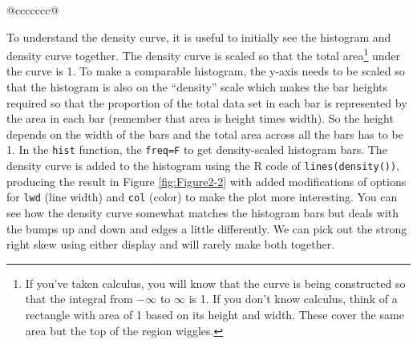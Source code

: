\documentclass[]{book}
\newenvironment{Shaded}{\begin{snugshade}}{\end{snugshade}}
\newcommand{\KeywordTok}[1]{\textcolor[rgb]{0.13,0.29,0.53}{\textbf{#1}}}
\newcommand{\DataTypeTok}[1]{\textcolor[rgb]{0.13,0.29,0.53}{#1}}
\newcommand{\DecValTok}[1]{\textcolor[rgb]{0.00,0.00,0.81}{#1}}
\newcommand{\StringTok}[1]{\textcolor[rgb]{0.31,0.60,0.02}{#1}}
\newcommand{\OperatorTok}[1]{\textcolor[rgb]{0.81,0.36,0.00}{\textbf{#1}}}
\newcommand{\NormalTok}[1]{#1}
\let\rmarkdownfootnote\footnote%
\def\footnote{\protect\rmarkdownfootnote}
\theoremstyle{definition}
\theoremstyle{definition}
\theoremstyle{remark}
\begin{document}
\begin{longtable}[]{@{}ccccccc@{}}
\begin{minipage}[b]{0.10\columnwidth}
To understand the density curve, it is useful to initially see the
histogram and density curve together. The density curve is scaled so
that the total area\footnote{If you've taken calculus, you will know
  that the curve is being constructed so that the integral from
  \(-\infty\) to \(\infty\) is 1. If you don't know calculus, think of a
  rectangle with area of 1 based on its height and width. These cover
  the same area but the top of the region wiggles.} under the curve is
1. To make a comparable histogram, the y-axis needs to be scaled so that
the histogram is also on the ``density'' scale which makes the bar
heights required so that the proportion of the total data set in each
bar is represented by the area in each bar (remember that area is height
times width). So the height depends on the width of the bars and the
total area across all the bars has to be 1. In the \texttt{hist}
function, the \texttt{freq=F} to get density-scaled histogram bars. The
density curve is added to the histogram using the R code of
\texttt{lines(density())}, producing the result in Figure
\ref{fig:Figure2-2} with added modifications of options for \texttt{lwd}
(line width) and \texttt{col} (color) to make the plot more interesting.
You can see how the density curve somewhat matches the histogram bars
but deals with the bumps up and down and edges a little differently. We
can pick out the strong right skew using either display and will rarely
make both together.



\begin{Shaded}
\end{Shaded}


\end{minipage}
\end{longtable}
\end{document}
